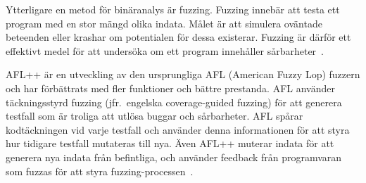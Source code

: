 Ytterligare en metod för binäranalys är fuzzing. Fuzzing innebär att testa ett
program med en stor mängd olika indata. Målet är att simulera oväntade beteenden
eller krashar om potentialen för dessa existerar. Fuzzing är därför ett
effektivt medel för att undersöka om ett program innehåller
sårbarheter~\cite{8371326}.

AFL++ är en utveckling av den ursprungliga AFL (American Fuzzy Lop) fuzzern och
har förbättrats med fler funktioner och bättre prestanda. AFL använder
täckningsstyrd fuzzing (jfr.\ engelska coverage-guided fuzzing) för att generera
testfall som är troliga att utlösa buggar och sårbarheter. AFL spårar
kodtäckningen vid varje testfall och använder denna informationen för att styra
hur tidigare testfall mutateras till nya. Även AFL++ muterar indata för att
generera nya indata från befintliga, och använder feedback från programvaran som
fuzzas för att styra fuzzing-processen~\cite{aflplusplus}.
